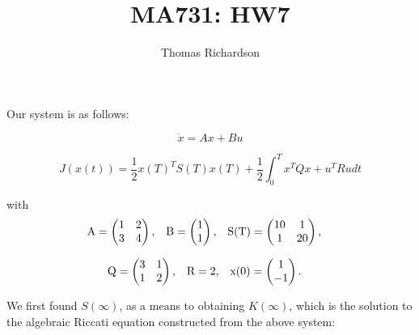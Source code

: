 \documentclass[12pt, notitlepage, letterpaper]{article}
\title{MA731: HW7}
\author{Thomas Richardson}
{\large }
\begin{document}

\baselineskip 24pt


\maketitle

\noindent

\paragraph{}

Our system is as follows:

\begin{equation}
\label{eq:sys01}
\dot{x} = Ax + Bu
\end{equation}

\begin{equation}
\label{eq:cost}
J(x(t)) = \frac{1}{2}x(T)^TS(T)x(T) +  \frac{1}{2}\int_{0}^{T}x^TQx + u^TRu dt
\end{equation}

with
\nonumber
\begin{align}
\label{eq:ABSQRBC}
\text{A} 
&=
\begin{pmatrix}
1 & 2 \\
3 & 4
\end{pmatrix}
,&
\hfill \text{B}
&=
\begin{pmatrix}
1 \\
1
\end{pmatrix}
,&
\text{S(T)}
&=
\begin{pmatrix}
10 &  1 \\
1  & 20
\end{pmatrix}
,
\end{align}

\nonumber
\begin{align}
\text{Q} 
&=
\begin{pmatrix}
3 & 1 \\
1 & 2
\end{pmatrix}
,&
\hfill \text{R}
&=
2
,&
\hfill \text{x(0)}
&=
\begin{pmatrix}
1 \\
-1
\end{pmatrix}.
\end{align}

We first found $S(\infty)$, as a means to obtaining $K(\infty)$, which is the solution to the algebraic Riccati equation constructed from the above system:
\end{document}

